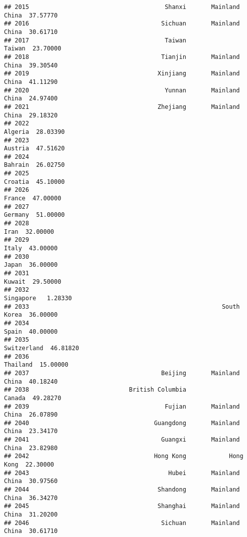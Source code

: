 \documentclass[
]{article}
\begin{document}
\begin{verbatim}
## 2015                                      Shanxi       Mainland China  37.57770
## 2016                                     Sichuan       Mainland China  30.61710
## 2017                                      Taiwan               Taiwan  23.70000
## 2018                                     Tianjin       Mainland China  39.30540
## 2019                                    Xinjiang       Mainland China  41.11290
## 2020                                      Yunnan       Mainland China  24.97400
## 2021                                    Zhejiang       Mainland China  29.18320
## 2022                                                          Algeria  28.03390
## 2023                                                          Austria  47.51620
## 2024                                                          Bahrain  26.02750
## 2025                                                          Croatia  45.10000
## 2026                                                           France  47.00000
## 2027                                                          Germany  51.00000
## 2028                                                             Iran  32.00000
## 2029                                                            Italy  43.00000
## 2030                                                            Japan  36.00000
## 2031                                                           Kuwait  29.50000
## 2032                                                        Singapore   1.28330
## 2033                                                      South Korea  36.00000
## 2034                                                            Spain  40.00000
## 2035                                                      Switzerland  46.81820
## 2036                                                         Thailand  15.00000
## 2037                                     Beijing       Mainland China  40.18240
## 2038                            British Columbia               Canada  49.28270
## 2039                                      Fujian       Mainland China  26.07890
## 2040                                   Guangdong       Mainland China  23.34170
## 2041                                     Guangxi       Mainland China  23.82980
## 2042                                   Hong Kong            Hong Kong  22.30000
## 2043                                       Hubei       Mainland China  30.97560
## 2044                                    Shandong       Mainland China  36.34270
## 2045                                    Shanghai       Mainland China  31.20200
## 2046                                     Sichuan       Mainland China  30.61710

\end{verbatim}
\end{document}
